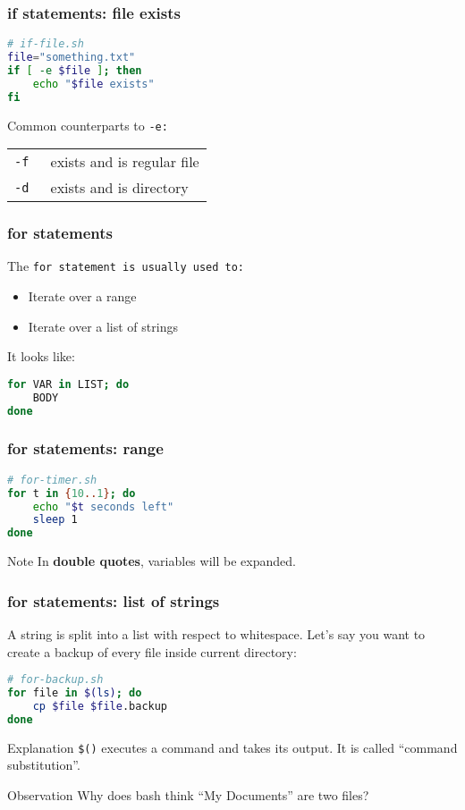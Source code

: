 \begin{frame}[fragile]
\frametitle{\textbf{if} statements: file exists}
\begin{lstlisting}[language=bash]
# if-file.sh
file="something.txt"
if [ -e $file ]; then
    echo "$file exists"
fi
\end{lstlisting}
Common counterparts to \tt{-e}:
\begin{table}
    \centering
    \begin{tabular}{ll}
        \tt{-f} & exists and is regular file \\
        \tt{-d} & exists and is directory
    \end{tabular}
\end{table}
\end{frame}

\begin{frame}[fragile]
\frametitle{\textbf{for} statements}
The \tt{for} statement is usually used to:
\begin{itemize}
    \item Iterate over a range
    \item Iterate over a list of strings
\end{itemize}
It looks like:
\begin{lstlisting}[language=bash]
for VAR in LIST; do
    BODY
done
\end{lstlisting}
\end{frame}

\begin{frame}[fragile]
\frametitle{\textbf{for} statements: range}
\begin{lstlisting}[language=bash]
# for-timer.sh
for t in {10..1}; do
    echo "$t seconds left"
    sleep 1
done
\end{lstlisting}
\begin{block}{Note}
    In \textbf{double quotes}, variables will be expanded.
\end{block}
\end{frame}

\begin{frame}[fragile]
\frametitle{\textbf{for} statements: list of strings}
A string is split into a list with respect to whitespace.
\newline \newline
Let's say you want to create a backup of every file inside current directory:
\begin{lstlisting}[language=bash]
# for-backup.sh
for file in $(ls); do
    cp $file $file.backup
done
\end{lstlisting}
\begin{block}{Explanation}
    \verb|$()| executes a command and takes its output.
    It is called ``command substitution''.
\end{block}
\begin{block}{Observation}
    Why does bash think ``My Documents'' are two files?
\end{block}
\end{frame}


